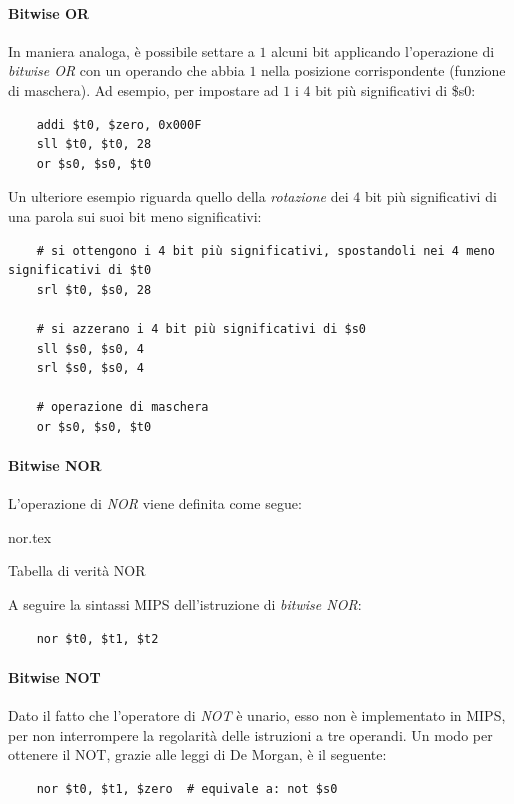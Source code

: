 \documentclass[class=book, crop=false]{standalone}
\begin{document}
\paragraph{Bitwise OR}
In maniera analoga, è possibile settare a \(1\) alcuni bit applicando l'operazione di \emph{bitwise OR} con un operando che abbia \(1\) nella posizione corrispondente (funzione di maschera). Ad esempio, per impostare ad \(1\) i \(4\) bit più significativi di \$s0:
\begin{verbatim}
	addi $t0, $zero, 0x000F
	sll $t0, $t0, 28
	or $s0, $s0, $t0
\end{verbatim}

Un ulteriore esempio riguarda quello della \emph{rotazione} dei \(4\) bit più significativi di una parola sui suoi bit meno significativi:
\begin{verbatim}
	# si ottengono i 4 bit più significativi, spostandoli nei 4 meno significativi di $t0
	srl $t0, $s0, 28

	# si azzerano i 4 bit più significativi di $s0
	sll $s0, $s0, 4
	srl $s0, $s0, 4

	# operazione di maschera
	or $s0, $s0, $t0
\end{verbatim}

\paragraph{Bitwise NOR}
L'operazione di \emph{NOR} viene definita come segue:
\begin{table}[H]
	\centering
	{nor.tex}
	\caption{Tabella di verità NOR}
\end{table}

A seguire la sintassi MIPS dell'istruzione di \emph{bitwise NOR}:
\begin{verbatim}
	nor $t0, $t1, $t2
\end{verbatim}

\paragraph{Bitwise NOT}
Dato il fatto che l'operatore di \emph{NOT} è unario, esso non è implementato in MIPS, per non interrompere la regolarità delle istruzioni a tre operandi. Un modo per ottenere il NOT, grazie alle leggi di De Morgan, è il seguente:
\begin{verbatim}
	nor $t0, $t1, $zero  # equivale a: not $s0
\end{verbatim}
\end{document}
